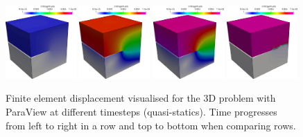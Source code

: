 \begin{figure}[h!]
\centering

\includegraphics[width=0.24\textwidth]{./Images/u3d0.png}
\includegraphics[width=0.24\textwidth]{./Images/u3d1.png}
\includegraphics[width=0.24\textwidth]{./Images/u3d2.png}
\includegraphics[width=0.24\textwidth]{./Images/u3d3.png}
\caption{Finite element displacement visualised for the 3D problem with ParaView at different timesteps (quasi-statics). Time progresses from left to right in a row and top to bottom when comparing rows. \label{u3d-fem}}
\end{figure}

